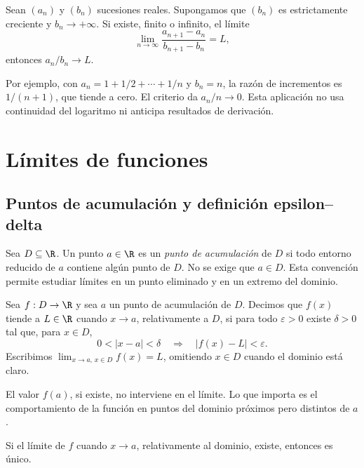 \begin{teorema}
Sean \((a_n)\) y \((b_n)\) sucesiones reales. Supongamos que \((b_n)\) es
estrictamente creciente y \(b_n\to+\infty\). Si existe, finito o infinito, el
límite
\[
  \lim_{n\to\infty}
  \frac{a_{n+1}-a_n}{b_{n+1}-b_n}=L,
\]
entonces \(a_n/b_n\to L\).
\end{teorema}

Por ejemplo, con \(a_n=1+1/2+\cdots+1/n\) y \(b_n=n\), la razón de
incrementos es \(1/(n+1)\), que tiende a cero. El criterio da \(a_n/n\to0\).
Esta aplicación no usa continuidad del logaritmo ni anticipa resultados de
derivación.

\section{Límites de funciones}
\label{sec:limites-funciones}

\subsection{Puntos de acumulación y definición epsilon--delta}

Sea \(D\subseteq\R\). Un punto \(a\in\R\) es un \emph{punto de acumulación}
de \(D\) si todo entorno reducido de \(a\) contiene algún punto de \(D\). No
se exige que \(a\in D\). Esta convención permite estudiar límites en un punto
eliminado y en un extremo del dominio.

\begin{definicion}
Sea \(f:D\to\R\) y sea \(a\) un punto de acumulación de \(D\). Decimos que
\(f(x)\) tiende a \(L\in\R\) cuando \(x\to a\), relativamente a \(D\), si
para todo \(\varepsilon>0\) existe \(\delta>0\) tal que, para \(x\in D\),
\[
  0<|x-a|<\delta
  \quad\Longrightarrow\quad
  |f(x)-L|<\varepsilon.
\]
Escribimos \(\lim_{x\to a,\,x\in D}f(x)=L\), omitiendo \(x\in D\) cuando el
dominio está claro.
\end{definicion}

El valor \(f(a)\), si existe, no interviene en el límite. Lo que importa es el
comportamiento de la función en puntos del dominio próximos pero distintos de
\(a\).

\begin{proposicion}
Si el límite de \(f\) cuando \(x\to a\), relativamente al dominio, existe,
entonces es único.
\end{proposicion}

